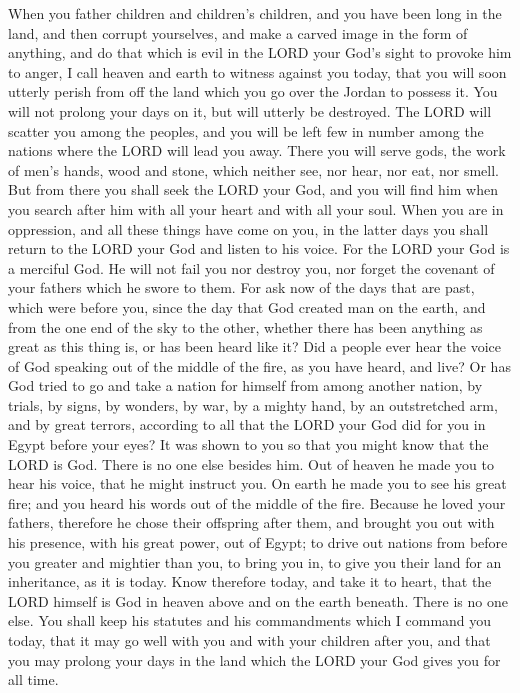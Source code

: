 \myverse{}When you father children and children’s children, and you have been long in
the land, and then corrupt yourselves, and make a carved image in the form of anything, and do that which
is evil in the LORD your God’s sight to provoke him to anger,
\myverse{}I call heaven and earth to witness against you today, that you will soon utterly
perish from off the land which you go over the Jordan to possess it. You will not prolong your days on
it, but will utterly be destroyed.
\myverse{}The LORD will scatter you among the peoples, and you will be left few in number
among the nations where the LORD will lead you away.
\myverse{}There you will serve gods, the work of men’s hands, wood and stone, which
neither see, nor hear, nor eat, nor smell.
\myverse{}But from there you shall seek the LORD your God, and you will find him when
you search after him with all your heart and with all your soul.
\myverse{}When you are in oppression, and all these things have come on you, in the
latter days you shall return to the LORD your God and listen to his voice.
\myverse{}For the LORD your God is a merciful God. He will not fail you nor destroy
you, nor forget the covenant of your fathers which he swore to them.
\myverse{}For ask now of the days that are past, which were before you, since the day
that God created man on the earth, and from the one end of the sky to the other, whether there has been
anything as great as this thing is, or has been heard like it?
\myverse{}Did a people ever hear the voice of God speaking out of the middle of the
fire, as you have heard, and live?
\myverse{}Or has God tried to go and take a nation for himself from among another nation,
by trials, by signs, by wonders, by war, by a mighty hand, by an outstretched arm, and by great terrors,
according to all that the LORD your God did for you in Egypt before your eyes?
\myverse{}It was shown to you so that you might know that the LORD is God. There is
no one else besides him.
\myverse{}Out of heaven he made you to hear his voice, that he might instruct you. On
earth he made you to see his great fire; and you heard his words out of the middle of the fire.
\myverse{}Because he loved your fathers, therefore he chose their offspring after them,
and brought you out with his presence, with his great power, out of Egypt;
\myverse{}to drive out nations from before you greater and mightier than you, to bring
you in, to give you their land for an inheritance, as it is today.
\myverse{}Know therefore today, and take it to heart, that the LORD himself is God in
heaven above and on the earth beneath. There is no one else.
\myverse{}You shall keep his statutes and his commandments which I command you today,
that it may go well with you and with your children after you, and that you may prolong your days in the
land which the LORD your God gives you for all time.


